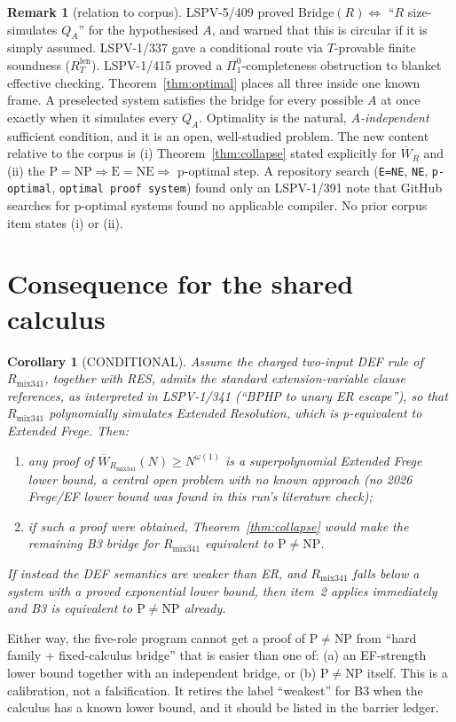 \documentclass[11pt]{article}
\newtheorem{corollary}[theorem]{Corollary}
\theoremstyle{definition}
\newtheorem{remark}[theorem]{Remark}
\newcommand{\Wbar}{\overline W}
\begin{document}
\begin{remark}[relation to corpus]
LSPV-5/409 proved Bridge$(R)\iff$ ``$R$ size-simulates $Q_A$'' for the hypothesised $A$, and warned that this is circular if it is simply assumed. LSPV-1/337 gave a conditional route via $T$-provable finite soundness ($R_T^{\mathrm{len}}$). LSPV-1/415 proved a $\Pi^0_1$-completeness obstruction to blanket effective checking. Theorem~\ref{thm:optimal} places all three inside one known frame. A preselected system satisfies the bridge for every possible $A$ at once exactly when it simulates every $Q_A$. Optimality is the natural, \emph{$A$-independent} sufficient condition, and it is an open, well-studied problem. The new content relative to the corpus is (i) Theorem~\ref{thm:collapse} stated explicitly for $\Wbar_R$ and (ii) the $\mathrm P=\mathrm{NP}\Rightarrow\mathrm E=\mathrm{NE}\Rightarrow$ p-optimal step. A repository search (\texttt{E=NE}, \texttt{NE}, \texttt{p-optimal}, \texttt{optimal proof system}) found only an LSPV-1/391 note that GitHub searches for p-optimal systems found no applicable compiler. No prior corpus item states (i) or (ii).
\end{remark}

\section{Consequence for the shared calculus}
\begin{corollary}[CONDITIONAL]\label{cor:mix}
Assume the charged two-input DEF rule of $R_{\mathrm{mix341}}$, together with RES, admits the standard extension-variable clause references, as interpreted in LSPV-1/341 (``BPHP to unary ER escape''), so that $R_{\mathrm{mix341}}$ polynomially simulates Extended Resolution, which is p-equivalent to Extended Frege. Then:
\begin{enumerate}
\item any proof of $\Wbar_{R_{\mathrm{mix341}}}(N)\ge N^{\omega(1)}$ is a superpolynomial Extended Frege lower bound, a central open problem with no known approach (no 2026 Frege/EF lower bound was found in this run's literature check);
\item if such a proof were obtained, Theorem~\ref{thm:collapse} would make the remaining B3 bridge for $R_{\mathrm{mix341}}$ equivalent to $\mathrm P\neq\mathrm{NP}$.
\end{enumerate}
If instead the DEF semantics are \emph{weaker} than ER, and $R_{\mathrm{mix341}}$ falls below a system with a proved exponential lower bound, then item~2 applies immediately and B3 is equivalent to $\mathrm P\neq\mathrm{NP}$ already.
\end{corollary}
Either way, the five-role program cannot get a proof of P$\neq$NP from ``hard family + fixed-calculus bridge'' that is easier than one of: (a) an EF-strength lower bound together with an independent bridge, or (b) P$\neq$NP itself. This is a calibration, not a falsification. It retires the label ``weakest'' for B3 when the calculus has a known lower bound, and it should be listed in the barrier ledger.
\end{document}
